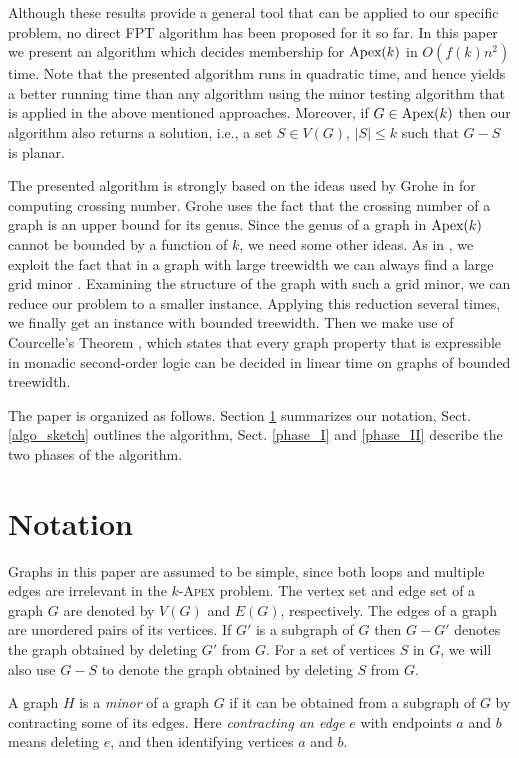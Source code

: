 \documentclass{llncs}
\begin{document}
Although these results provide a general tool that can be applied to our specific problem,
no direct FPT algorithm has been proposed for it so far.
In this paper we present an algorithm which decides membership for $\textup{Apex}(k)$ in $O(f(k)n^2)$ time.
Note that the presented algorithm runs in quadratic time, and hence yields a better running time than
any algorithm using the minor testing algorithm that is applied in the above mentioned approaches.
Moreover, if $G \in \textup{Apex}(k)$ then our algorithm also returns a solution,
i.e., a set $S \in V(G)$, $|S| \leq k$ such that $G-S$ is planar.

The presented algorithm is strongly based on the ideas used by Grohe in \cite{gro04}
for computing crossing number.
Grohe uses the fact that the crossing number of a graph is an upper bound for its genus.
Since the genus of a graph in $\textup{Apex}(k)$ cannot be bounded by a function of $k$,
we need some other ideas.
As in \cite{gro04}, we exploit the fact that in a graph with large treewidth
we can always find a large grid minor \cite{sey94}. Examining the structure of
the graph with such a grid minor, we can reduce our problem to a smaller instance.
Applying this reduction several times, we finally get an instance with
bounded treewidth. Then we make use of Courcelle's Theorem \cite{cou90}, which
states that every graph property that is expressible in monadic second-order logic
can be decided in linear time on graphs of bounded treewidth.

The paper is organized as follows.
Section \ref{notation} summarizes our notation,
Sect. \ref{algo_sketch} outlines the algorithm,
Sect. \ref{phase_I} and \ref{phase_II} describe the two phases of the algorithm.


\section{Notation}
\label{notation}

Graphs in this paper are assumed to be simple, since both loops and multiple edges are
irrelevant in the
$k$-\textsc{Apex}
problem.
The vertex set and edge set of a graph $G$
are denoted by $V(G)$ and $E(G)$, respectively.
The edges of a graph are unordered pairs of its vertices.
If $G'$ is a subgraph of $G$ then $G-G'$ denotes
the graph obtained by deleting $G'$ from $G$. For a set of vertices $S$ in $G$,
we will also use $G-S$ to denote the graph obtained by deleting $S$ from $G$.

A graph $H$ is a \emph{minor} of a graph $G$ if it can be obtained from a subgraph of $G$
by contracting some of its edges. Here \emph{contracting an edge} $e$ with endpoints $a$ and $b$ means
deleting $e$, and then identifying vertices $a$ and $b$.
\end{document}

